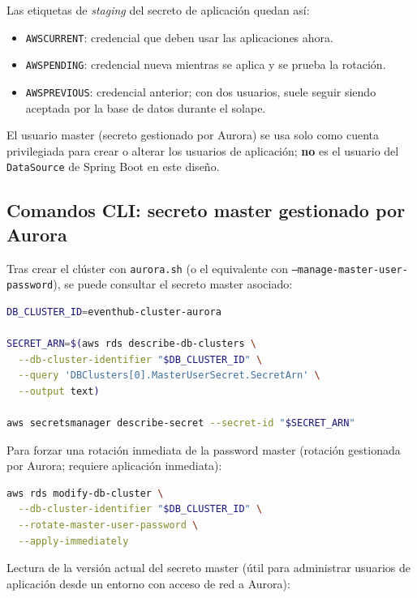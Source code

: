 Las etiquetas de \textit{staging} del secreto de aplicación quedan así:

\begin{itemize}
    \item \texttt{AWSCURRENT}: credencial que deben usar las aplicaciones ahora.
    \item \texttt{AWSPENDING}: credencial nueva mientras se aplica y se prueba la rotación.
    \item \texttt{AWSPREVIOUS}: credencial anterior; con dos usuarios, suele seguir siendo aceptada por la base de datos durante el solape.
\end{itemize}

El usuario master (secreto gestionado por Aurora) se usa solo como cuenta privilegiada para crear o alterar los usuarios de aplicación; \textbf{no} es el usuario del \texttt{DataSource} de Spring Boot en este diseño.

\subsection{Comandos CLI: secreto master gestionado por Aurora}

Tras crear el clúster con \texttt{aurora.sh} (o el equivalente con \texttt{--manage-master-user-password}), se puede consultar el secreto master asociado:

\begin{lstlisting}[language=bash,basicstyle=\ttfamily\footnotesize]
DB_CLUSTER_ID=eventhub-cluster-aurora

SECRET_ARN=$(aws rds describe-db-clusters \
  --db-cluster-identifier "$DB_CLUSTER_ID" \
  --query 'DBClusters[0].MasterUserSecret.SecretArn' \
  --output text)

aws secretsmanager describe-secret --secret-id "$SECRET_ARN"
\end{lstlisting}

Para forzar una rotación inmediata de la password master (rotación gestionada por Aurora; requiere aplicación inmediata):

\begin{lstlisting}[language=bash,basicstyle=\ttfamily\footnotesize]
aws rds modify-db-cluster \
  --db-cluster-identifier "$DB_CLUSTER_ID" \
  --rotate-master-user-password \
  --apply-immediately
\end{lstlisting}

Lectura de la versión actual del secreto master (útil para administrar usuarios de aplicación desde un entorno con acceso de red a Aurora):

